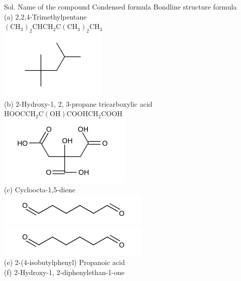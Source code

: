 \documentclass[10pt]{article}
\begin{document}
Sol. Name of the compound Condensed formula Bondline structure formula\\
(a) 2,2,4-Trimethylpentane\\
$\left(\mathrm{CH}_{3}\right)_{2} \mathrm{CHCH}_{2} \mathrm{C}\left(\mathrm{CH}_{3}\right)_{2} \mathrm{CH}_{3}$\\
\includegraphics{smile-a5507448056a62ece8c5b72c4f7b6d23eea01bd8}\\
(b) 2-Hydroxy-1, 2, 3-propane tricarboxylic acid\\
$\mathrm{HOOCCH}_{2} \mathrm{C}(\mathrm{OH}) \mathrm{COOHCH}_{2} \mathrm{COOH}$\\
\includegraphics{smile-eaddfbc34c74cbe4584189851f5cdac19757391d}\\
(c) Cycloocta-1,5-diene\\
\includegraphics{smile-5ae1726317a42d95bf0a6ec426c8c100c19af43c}\\
\includegraphics{smile-0c9d2829dbc7db796895a0a88785ee3337d6713c}\\
(e) 2-(4-isobutylphenyl) Propanoic acid\\
(f) 2-Hydroxy-1, 2-diphenylethan-1-one\\
\end{document}
